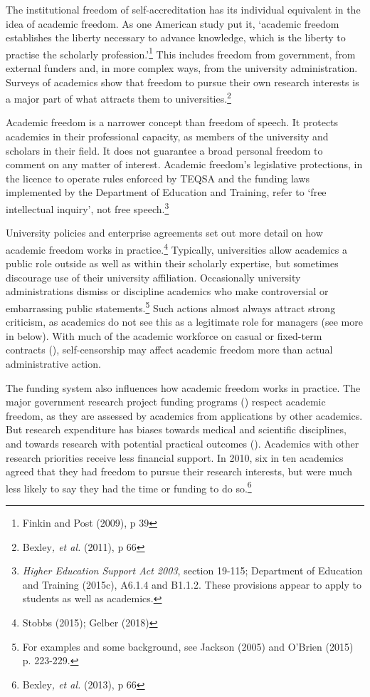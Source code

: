 \documentclass{grattan}
\begin{document}
The institutional freedom of self-accreditation has its individual equivalent in the idea of academic freedom. As one American study put it, `academic freedom establishes the liberty necessary to advance knowledge, which is the liberty to practise the scholarly profession.'\footnote{Finkin and Post (2009), p 39} This includes freedom from government, from external funders and, in more complex ways, from the university administration. Surveys of academics show that freedom to pursue their own research interests is a major part of what attracts them to universities.\footnote{Bexley\emph{, et al.} (2011), p 66}

Academic freedom is a narrower concept than freedom of speech. It protects academics in their professional capacity, as members of the university and scholars in their field. It does not guarantee a broad personal freedom to comment on any matter of interest. Academic freedom's legislative protections, in the licence to operate rules enforced by TEQSA and the funding laws implemented by the Department of Education and Training, refer to `free intellectual inquiry', not free speech.\footnote{\emph{Higher Education Support Act 2003}, section 19-115; Department of Education and Training (2015c), A6.1.4 and B1.1.2. These provisions appear to apply to students as well as academics.}

University policies and enterprise agreements set out more detail on how academic freedom works in practice.\footnote{Stobbs (2015); Gelber (2018)} Typically, universities allow academics a public role outside as well as within their scholarly expertise, but sometimes discourage use of their university affiliation. Occasionally university administrations dismiss or discipline academics who make controversial or embarrassing public statements.\footnote{For examples and some background, see Jackson (2005) and O'Brien (2015) p. 223-229.} Such actions almost always attract strong criticism, as academics do not see this as a legitimate role for managers (see more in  below). With much of the academic workforce on casual or fixed-term contracts (), self-censorship may affect academic freedom more than actual administrative action.

The funding system also influences how academic freedom works in practice. The major government research project funding programs () respect academic freedom, as they are assessed by academics from applications by other academics. But research expenditure has biases towards medical and scientific disciplines, and towards research with potential practical outcomes (). Academics with other research priorities receive less financial support. In 2010, six in ten academics agreed that they had freedom to pursue their research interests, but were much less likely to say they had the time or funding to do so.\footnote{Bexley\emph{, et al.} (2013), p 66}
\end{document}
